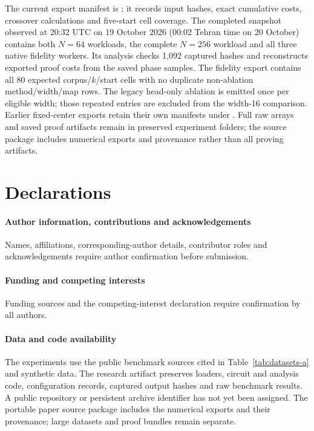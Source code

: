\documentclass[5p,times,twocolumn]{elsarticle}
\theoremstyle{plain}
\theoremstyle{definition}
\theoremstyle{remark}
\begin{document}
\par\endgroup
\begingroup\color{RevisionRed}
The current export manifest is ; it records input hashes, exact cumulative costs, crossover calculations and five-start cell coverage. The completed snapshot observed at 20:32 UTC on 19 October 2026 (00:02 Tehran time on 20 October) contains both $N=64$ workloads, the complete $N=256$ workload and all three native fidelity workers. Its analysis checks 1,092 captured hashes and reconstructs exported proof costs from the saved phase samples. The fidelity export contains all 80 expected corpus/$k$/start cells with no duplicate non-ablation method/width/map rows. The legacy head-only ablation is emitted once per eligible width; those repeated entries are excluded from the width-16 comparison. Earlier fixed-center exports retain their own manifests under . Full raw arrays and saved proof artifacts remain in preserved experiment folders; the source package includes numerical exports and provenance rather than all proving artifacts.


\par\endgroup

\FloatBarrier
\twocolumn
\section*{Declarations}
\paragraph{\textcolor{RevisionRed}{Author information, contributions and acknowledgements}}
\begingroup\color{RevisionRed}
Names, affiliations, corresponding-author details, contributor roles and acknowledgements require author confirmation before submission.

\par\endgroup
\paragraph{\textcolor{RevisionRed}{Funding and competing interests}}
\begingroup\color{RevisionRed}
Funding sources and the competing-interest declaration require confirmation by all authors.

\par\endgroup
\paragraph{\textcolor{RevisionRed}{Data and code availability}}
\begingroup\color{RevisionRed}
The experiments use the public benchmark sources cited in Table~\ref{tab:datasets-a} and synthetic data. The research artifact preserves loaders, circuit and analysis code, configuration records, captured output hashes and raw benchmark results. A public repository or persistent archive identifier has not yet been assigned. The portable paper source package includes the numerical exports and their provenance; large datasets and proof bundles remain separate.
\end{document}
